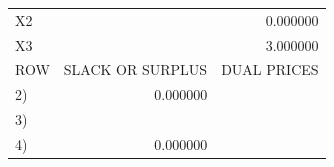 \begin{problems}
\begin{center}
\begin{tabular}{lrr}
        X2 & \underline{\hspace{3em}} & 0.000000\\
        X3 & \underline{\hspace{3em}} & 3.000000\\[3pt]
        ROW & SLACK OR SURPLUS & DUAL PRICES\\
        2) & 0.000000 & \underline{\hspace{3em}}\\
        3) & \underline{\hspace{3em}} & \underline{\hspace{3em}}\\
        4) & 0.000000 & \underline{\hspace{3em}}\\
        \end{tabular}


\end{center}
\end{problems}
